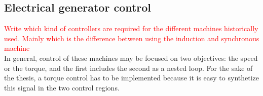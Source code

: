 \subsection{Electrical generator control}\label{subsec:PMSM_control}
\textcolor{red}{Write which kind of controllers are required for the different machines  historically used. Mainly which is the difference between using the induction and synchronous machine}\\
In general, control of these machines may be focused on two objectives: the speed or the torque, and the first includes the second as a nested loop. For the sake of the thesis, a torque control has to be implemented because it is easy to synthetize this signal in the two control regions. 

